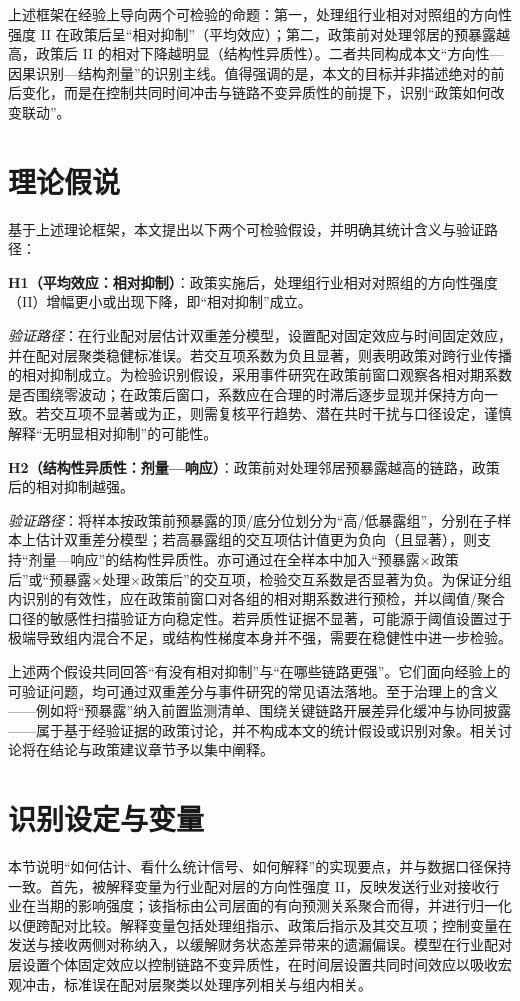 上述框架在经验上导向两个可检验的命题：第一，处理组行业相对对照组的方向性强度 II 在政策后呈“相对抑制”（平均效应）；第二，政策前对处理邻居的预暴露越高，政策后 II 的相对下降越明显（结构性异质性）。二者共同构成本文“方向性—因果识别—结构剂量”的识别主线。值得强调的是，本文的目标并非描述绝对的前后变化，而是在控制共同时间冲击与链路不变异质性的前提下，识别“政策如何改变联动”。

\section{理论假说}
基于上述理论框架，本文提出以下两个可检验假设，并明确其统计含义与验证路径：

\noindent\textbf{H1（平均效应：相对抑制）}：政策实施后，处理组行业相对对照组的方向性强度（II）增幅更小或出现下降，即“相对抑制”成立。

\noindent\textit{验证路径}：在行业配对层估计双重差分模型，设置配对固定效应与时间固定效应，并在配对层聚类稳健标准误。若交互项系数为负且显著，则表明政策对跨行业传播的相对抑制成立。为检验识别假设，采用事件研究在政策前窗口观察各相对期系数是否围绕零波动；在政策后窗口，系数应在合理的时滞后逐步显现并保持方向一致。若交互项不显著或为正，则需复核平行趋势、潜在共时干扰与口径设定，谨慎解释“无明显相对抑制”的可能性。

\noindent\textbf{H2（结构性异质性：剂量—响应）}：政策前对处理邻居预暴露越高的链路，政策后的相对抑制越强。

\noindent\textit{验证路径}：将样本按政策前预暴露的顶/底分位划分为“高/低暴露组”，分别在子样本上估计双重差分模型；若高暴露组的交互项估计值更为负向（且显著），则支持“剂量—响应”的结构性异质性。亦可通过在全样本中加入“预暴露×政策后”或“预暴露×处理×政策后”的交互项，检验交互系数是否显著为负。为保证分组内识别的有效性，应在政策前窗口对各组的相对期系数进行预检，并以阈值/聚合口径的敏感性扫描验证方向稳定性。若异质性证据不显著，可能源于阈值设置过于极端导致组内混合不足，或结构性梯度本身并不强，需要在稳健性中进一步检验。

上述两个假设共同回答“有没有相对抑制”与“在哪些链路更强”。它们面向经验上的可验证问题，均可通过双重差分与事件研究的常见语法落地。至于治理上的含义——例如将“预暴露”纳入前置监测清单、围绕关键链路开展差异化缓冲与协同披露——属于基于经验证据的政策讨论，并不构成本文的统计假设或识别对象。相关讨论将在结论与政策建议章节予以集中阐释。

\section{识别设定与变量}
本节说明“如何估计、看什么统计信号、如何解释”的实现要点，并与数据口径保持一致。首先，被解释变量为行业配对层的方向性强度 II，反映发送行业对接收行业在当期的影响强度；该指标由公司层面的有向预测关系聚合而得，并进行归一化以便跨配对比较。解释变量包括处理组指示、政策后指示及其交互项；控制变量在发送与接收两侧对称纳入，以缓解财务状态差异带来的遗漏偏误。模型在行业配对层设置个体固定效应以控制链路不变异质性，在时间层设置共同时间效应以吸收宏观冲击，标准误在配对层聚类以处理序列相关与组内相关。

